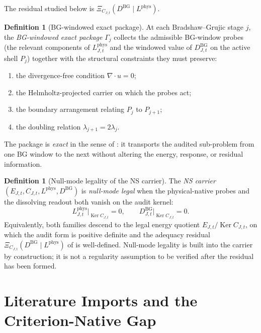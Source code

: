 \documentclass[11pt]{article}
\DeclareMathOperator{\Ker}{Ker}
\newcommand{\DBG}{D^{\mathrm{BG}}}
\newcommand{\Lphys}{L^{\mathrm{phys}}}
\theoremstyle{definition}
\newtheorem{definition}[theorem]{Definition}
\begin{document}
The residual studied below is \(\Xi_{C_{J,t}}(\DBG\mid\Lphys)\).

\begin{definition}[BG-windowed exact package]\label{def:ns:bg-package}
At each Bradshaw--Grujic stage \(j\), the \emph{BG-windowed
exact package} \(\Gamma_j\) collects the admissible
BG-window probes (the relevant components of
\(\Lphys_{J,t}\) and the windowed value of \(\DBG_{J,t}\)
on the active shell \(P_j\)) together with the structural
constraints they must preserve:
\begin{enumerate}[label=(\alph*)]
  \item the divergence-free condition \(\nabla\cdot u=0\);
  \item the Helmholtz-projected carrier
    \citep{Galdi2011} on which the probes act;
  \item the boundary arrangement relating \(P_j\) to
    \(P_{j+1}\);
  \item the doubling relation
    \(\lambda_{j+1}=2\lambda_j\).
\end{enumerate}
The package is \emph{exact} in the sense of
\citet{Tsiokos2026NeedleKiller}: it transports the audited
sub-problem from one BG window to the next without
altering the energy, response, or residual information.
\end{definition}

\begin{definition}[Null-mode legality of the NS carrier]\label{def:ns:null-mode-legal-ns}
The \emph{NS carrier} \((E_{J,t},C_{J,t},\Lphys,\DBG)\) is
\emph{null-mode legal} when the physical-native probes and
the dissolving readout both vanish on the audit kernel:
\[
  \Lphys_{J,t}\big|_{\Ker C_{J,t}}=0,
  \qquad
  \DBG_{J,t}\big|_{\Ker C_{J,t}}=0 .
\]
Equivalently, both families descend to the legal energy
quotient \(E_{J,t}/\Ker C_{J,t}\), on which the audit form
is positive definite and the adequacy residual
\(\Xi_{C_{J,t}}(\DBG\mid\Lphys)\) of
\citet{Tsiokos2026XiCompanion} is well-defined.  Null-mode
legality is built into the carrier by construction; it is
not a regularity assumption to be verified after the
residual has been formed.
\end{definition}

 

\section{Literature Imports and the Criterion-Native Gap}
\label{sec:imports}
\end{document}
